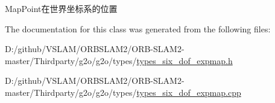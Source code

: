 Map\+Point在世界坐标系的位置 



The documentation for this class was generated from the following files\+:\begin{DoxyCompactItemize}
\item 
D\+:/github/\+V\+S\+L\+A\+M/\+O\+R\+B\+S\+L\+A\+M2/\+O\+R\+B-\/\+S\+L\+A\+M2-\/master/\+Thirdparty/g2o/g2o/types/\mbox{\hyperlink{types__six__dof__expmap_8h}{types\+\_\+six\+\_\+dof\+\_\+expmap.\+h}}\item 
D\+:/github/\+V\+S\+L\+A\+M/\+O\+R\+B\+S\+L\+A\+M2/\+O\+R\+B-\/\+S\+L\+A\+M2-\/master/\+Thirdparty/g2o/g2o/types/\mbox{\hyperlink{types__six__dof__expmap_8cpp}{types\+\_\+six\+\_\+dof\+\_\+expmap.\+cpp}}\end{DoxyCompactItemize}
